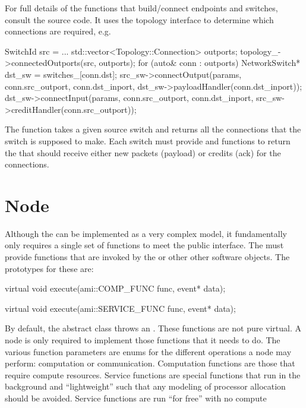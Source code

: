 For full details of the functions that build/connect endpoints and switches, consult the source code.
It uses the topology interface to determine which connections are required, e.g.

\begin{CppCode}
SwitchId src = ...
std::vector<Topology::Connection> outports;
topology_->connectedOutports(src, outports);
for (auto& conn : outports){
  NetworkSwitch* dst_sw = switches_[conn.dst];
  src_sw->connectOutput(params, conn.src_outport, conn.dst_inport,
  					 dst_sw->payloadHandler(conn.dst_inport));
  dst_sw->connectInput(params, conn.src_outport, conn.dst_inport,
  				       src_sw->creditHandler(conn.src_outport));
}
\end{CppCode}
The  function takes a given source switch and returns all the connections that the
switch is supposed to make.  Each switch must provide  and  functions to return
the  that should receive either new packets (payload) or credits (ack) for the connections.

\section{Node}\label{sec:node}
Although the \nodecls can be implemented as a very complex model, it fundamentally only requires a single set of functions to meet the public interface.
The \nodecls must provide  functions that are invoked by the  or other other software objects.
The prototypes for these are:

\begin{CppCode}
virtual void execute(ami::COMP_FUNC func, event* data);

virtual void execute(ami::SERVICE_FUNC func, event* data);
\end{CppCode}	

By default, the abstract \nodecls class throws an . These functions are not pure virtual.
A node is only required to implement those functions that it needs to do.
The various function parameters are enums for the different operations a node may perform:
computation or communication. Computation functions are those that require compute resources. Service functions are special functions that run in the background and ``lightweight'' such that any modeling of processor allocation should be avoided. Service functions are run ``for free'' with no compute 

